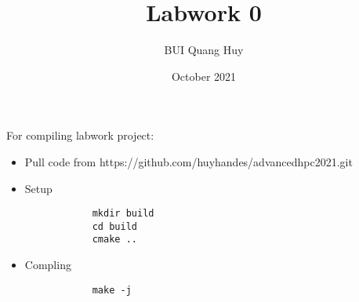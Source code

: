 \documentclass{article}
\title{Labwork 0}
\author{BUI Quang Huy}
\date{October 2021}
\begin{document}
\maketitle

For compiling labwork project:

\begin{itemize}
    \item Pull code from https://github.com/huyhandes/advancedhpc2021.git
	\item Setup 
		\begin{verbatim}
			mkdir build
			cd build
			cmake ..
		\end{verbatim}
	\item Compling
		\begin{verbatim}
			make -j
		\end{verbatim}
\end{itemize}
\end{document}
